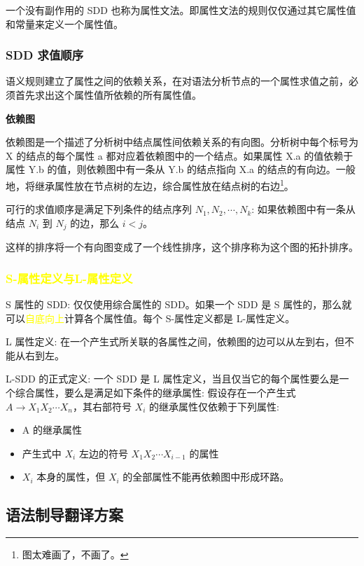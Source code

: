 一个没有副作用的 SDD 也称为属性文法。即属性文法的规则仅仅通过其它属性值和常量来定义一个属性值。

\subsubsection{SDD 求值顺序}

语义规则建立了属性之间的依赖关系，在对语法分析节点的一个属性求值之前，必须首先求出这个属性值所依赖的所有属性值。

\noindent\textbf{依赖图}

依赖图是一个描述了分析树中结点属性间依赖关系的有向图。分析树中每个标号为 X 的结点的每个属性 a 都对应着依赖图中的一个结点。如果属性 X.a 的值依赖于属性 Y.b 的值，则依赖图中有一条从 Y.b 的结点指向 X.a 的结点的有向边。一般地，将继承属性放在节点树的左边，综合属性放在结点树的右边\footnote{图太难画了，不画了。}。

可行的求值顺序是满足下列条件的结点序列 $N_1, N_2, \cdots, N_k$: 如果依赖图中有一条从结点 $N_i$ 到 $N_j$ 的边，那么 $i<j$。

这样的排序将一个有向图变成了一个线性排序，这个排序称为这个图的拓扑排序。

\subsubsection{\textcolor{mark}{S-属性定义与L-属性定义}}

S 属性的 SDD: 仅仅使用综合属性的 SDD。如果一个 SDD 是 S 属性的，那么就可以\textcolor{mark}{自底向上}计算各个属性值。每个 S-属性定义都是 L-属性定义。

L 属性定义: 在一个产生式所关联的各属性之间，依赖图的边可以从左到右，但不能从右到左。

L-SDD 的正式定义: 一个 SDD 是 L 属性定义，当且仅当它的每个属性要么是一个综合属性，要么是满足如下条件的继承属性: 假设存在一个产生式 $A \rightarrow X_1 X_2 \cdots X_n$，其右部符号 $X_i$ 的继承属性仅依赖于下列属性:
\begin{itemize}
    \item A 的继承属性
    \item 产生式中 $X_i$ 左边的符号  $X_1 X_2 \cdots X_{i-1}$ 的属性
    \item $X_i$ 本身的属性，但 $X_i$ 的全部属性不能再依赖图中形成环路。
\end{itemize}

\subsection{语法制导翻译方案}


